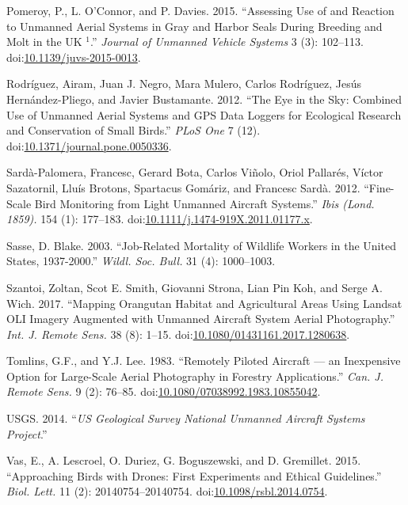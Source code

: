 \documentclass[]{interact}
\theoremstyle{plain}%
\theoremstyle{definition}
\theoremstyle{remark}
\begin{document}
\hypertarget{ref-pomeroy_assessing_2015}{}
Pomeroy, P., L. O'Connor, and P. Davies. 2015. ``Assessing Use of and
Reaction to Unmanned Aerial Systems in Gray and Harbor Seals During
Breeding and Molt in the UK \(^{\textrm{1}}\).'' \emph{Journal of
Unmanned Vehicle Systems} 3 (3): 102--113.
doi:\href{https://doi.org/10.1139/juvs-2015-0013}{10.1139/juvs-2015-0013}.

\hypertarget{ref-rodriguez_eye_2012}{}
Rodríguez, Airam, Juan J. Negro, Mara Mulero, Carlos Rodríguez, Jesús
Hernández-Pliego, and Javier Bustamante. 2012. ``The Eye in the Sky:
Combined Use of Unmanned Aerial Systems and GPS Data Loggers for
Ecological Research and Conservation of Small Birds.'' \emph{PLoS One} 7
(12).
doi:\href{https://doi.org/10.1371/journal.pone.0050336}{10.1371/journal.pone.0050336}.

\hypertarget{ref-sarda-palomera_fine-scale_2012}{}
Sardà-Palomera, Francesc, Gerard Bota, Carlos Viñolo, Oriol Pallarés,
Víctor Sazatornil, Lluís Brotons, Spartacus Gomáriz, and Francesc Sardà.
2012. ``Fine-Scale Bird Monitoring from Light Unmanned Aircraft
Systems.'' \emph{Ibis (Lond. 1859).} 154 (1): 177--183.
doi:\href{https://doi.org/10.1111/j.1474-919X.2011.01177.x}{10.1111/j.1474-919X.2011.01177.x}.

\hypertarget{ref-sasse_job-related_2003}{}
Sasse, D. Blake. 2003. ``Job-Related Mortality of Wildlife Workers in
the United States, 1937-2000.'' \emph{Wildl. Soc. Bull.} 31 (4):
1000--1003.

\hypertarget{ref-szantoi_mapping_2017}{}
Szantoi, Zoltan, Scot E. Smith, Giovanni Strona, Lian Pin Koh, and Serge
A. Wich. 2017. ``Mapping Orangutan Habitat and Agricultural Areas Using
Landsat OLI Imagery Augmented with Unmanned Aircraft System Aerial
Photography.'' \emph{Int. J. Remote Sens.} 38 (8): 1--15.
doi:\href{https://doi.org/10.1080/01431161.2017.1280638}{10.1080/01431161.2017.1280638}.

\hypertarget{ref-tomlins_remotely_1983}{}
Tomlins, G.F., and Y.J. Lee. 1983. ``Remotely Piloted Aircraft --- an
Inexpensive Option for Large-Scale Aerial Photography in Forestry
Applications.'' \emph{Can. J. Remote Sens.} 9 (2): 76--85.
doi:\href{https://doi.org/10.1080/07038992.1983.10855042}{10.1080/07038992.1983.10855042}.

\hypertarget{ref-USGS2014}{}
USGS. 2014. ``\emph{US Geological Survey National Unmanned Aircraft
Systems Project}.''

\hypertarget{ref-vas_approaching_2015}{}
Vas, E., A. Lescroel, O. Duriez, G. Boguszewski, and D. Gremillet. 2015.
``Approaching Birds with Drones: First Experiments and Ethical
Guidelines.'' \emph{Biol. Lett.} 11 (2): 20140754--20140754.
doi:\href{https://doi.org/10.1098/rsbl.2014.0754}{10.1098/rsbl.2014.0754}.
\end{document}
